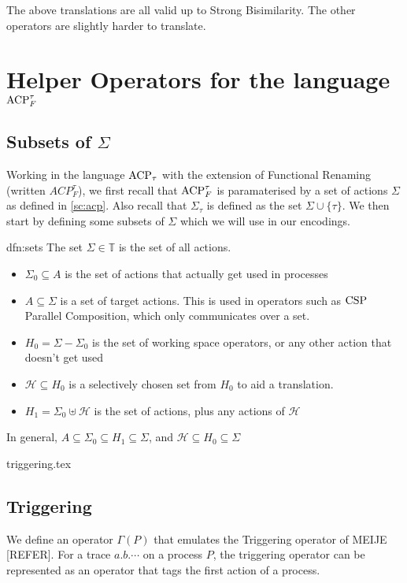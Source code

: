 \documentclass[../hons_project.tex]{subfiles}
\begin{document}
The above translations are all valid up to Strong Bisimilarity. The other operators are slightly harder to translate.

\section{Helper Operators for the language \texorpdfstring{$\mathrm{ACP}_{F}^{\tau}$}{ACPtf}}

\subsection{Subsets of \texorpdfstring{$\Sigma$}{Sigma}}
Working in the language $\mathrm{ACP}_{\tau}$ with the extension of Functional Renaming (written $ACP^{\tau}_{F}$), we first recall that $\mathrm{ACP}_{F}^{\tau}$ is paramaterised by a set of actions $\Sigma$ as defined in \ref{sc:acp}. Also recall that $\Sigma_{\tau}$ is defined as the set $\Sigma \cup \{\tau\}$. We then start by defining some subsets of $\Sigma$ which we will use in our encodings.

\begin{dfn}[Subsets of A]{dfn:sets}{}
	The set $\Sigma\in \mathbb{T}$ is the set of all actions.
	\begin{itemize}
		\item $\Sigma_{0} \subseteq A$ is the set of actions that actually get used in processes
		\item $A \subseteq \Sigma$ is a set of target actions. This is used in operators such as $\mathrm{CSP}$ Parallel Composition, which only communicates over a set.
		\item $H_{0} = \Sigma - \Sigma_{0}$ is the set of working space operators, or any other action that doesn't get used
		\item $\mathscr{H} \subseteq H_{0}$ is a selectively chosen set from $H_{0}$ to aid a translation.
		\item $H_{1} = \Sigma_{0} \uplus \mathscr{H}$ is the set of actions, plus any actions of $\mathscr{H}$
	\end{itemize}

	In general, $A \subseteq \Sigma_{0} \subseteq H_{1} \subseteq \Sigma$, and $\mathscr{H} \subseteq H_{0} \subseteq \Sigma$
\end{dfn}

{triggering.tex}
\subsection{Triggering}
We define an operator $\Gamma(P)$ that emulates the Triggering operator of MEIJE [REFER]. For a trace $a.b.\cdots$ on a process $P$, the triggering operator can be represented as an operator that tags the first action of a process.
\end{document}
